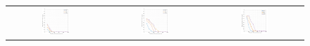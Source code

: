 \begin{figure}[!t]
	\begin{center}
	\begin{tabular}{ccc}
		\includegraphics[width=0.3\textwidth]{./fig/rconst_rcm_amp_1_r_1_s_3_12_m_100_1000_justice-pursuit.pdf}
&

		\includegraphics[width=0.3\textwidth]{./fig/rconst_rcm_amp_1_r_2_s_3_12_m_100_1000_justice-pursuit.pdf}
&

		\includegraphics[width=0.3\textwidth]{./fig/rconst_rcm_amp_1_r_4_s_3_12_m_100_1000_justice-pursuit.pdf}
\end{tabular}
	\end{center}
\end{figure}


